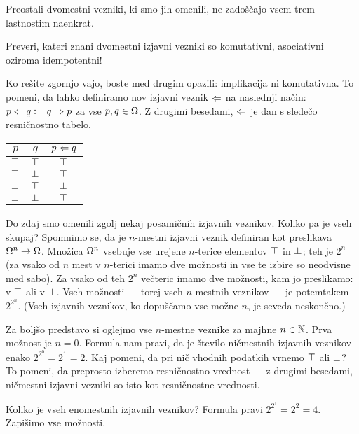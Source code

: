 		Preostali dvomestni vezniki, ki smo jih omenili, ne zadoščajo vsem trem lastnostim naenkrat.
		
		\begin{vaja}
			Preveri, kateri znani dvomestni izjavni vezniki so komutativni, asociativni oziroma idempotentni!
		\end{vaja}
		
		Ko rešite zgornjo vajo, boste med drugim opazili: implikacija ni komutativna. To pomeni, da lahko definiramo nov izjavni veznik $\Leftarrow$ na naslednji način: $p \Leftarrow q \mathrel{\mathop:}= q \Rightarrow p$ za vse $p, q \in \Omega$. Z drugimi besedami, $\Leftarrow$ je dan s sledečo resničnostno tabelo.
		\begin{center}
			\begin{tabular}{cc|c}
				$p$ & $q$ & $p \Leftarrow q$ \\
				\hline
				$\top$ & $\top$ & $\top$ \\
				$\top$ & $\bot$ & $\top$ \\
				$\bot$ & $\top$ & $\bot$ \\
				$\bot$ & $\bot$ & $\top$
			\end{tabular}
		\end{center}
		
		
		Do zdaj smo omenili zgolj nekaj posamičnih izjavnih veznikov. Koliko pa je vseh skupaj? Spomnimo se, da je $n$-mestni izjavni veznik definiran kot preslikava $\Omega^n \to \Omega$. Množica $\Omega^n$ vsebuje vse urejene $n$-terice elementov $\top$ in $\bot$; teh je $2^n$ (za vsako od $n$ mest v $n$-terici imamo dve možnosti in vse te izbire so neodvisne med sabo). Za vsako od teh $2^n$ večteric imamo dve možnosti, kam jo preslikamo: v $\top$ ali v $\bot$. Vseh možnosti --- torej vseh $n$-mestnih veznikov --- je potemtakem $2^{2^n}$. (Vseh izjavnih veznikov, ko dopuščamo vse možne $n$, je seveda neskončno.)
		
		Za boljšo predstavo si oglejmo vse $n$-mestne veznike za majhne $n \in \mathbb{N}$. Prva možnost je $n = 0$. Formula nam pravi, da je število ničmestnih izjavnih veznikov enako $2^{2^0} = 2^1 = 2$. Kaj pomeni, da pri nič vhodnih podatkih vrnemo $\top$ ali $\bot$? To pomeni, da preprosto izberemo resničnostno vrednost --- z drugimi besedami, ničmestni izjavni vezniki so isto kot resničnostne vrednosti.
		
		Koliko je vseh enomestnih izjavnih veznikov? Formula pravi $2^{2^1} = 2^2 = 4$. Zapišimo vse možnosti.
		
